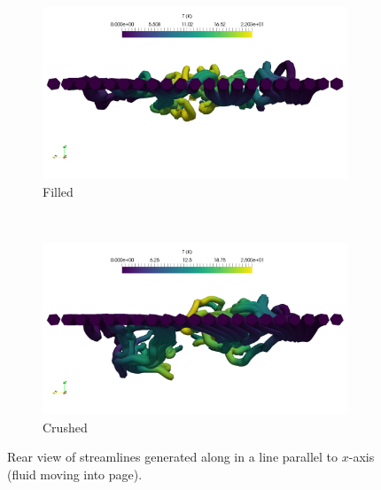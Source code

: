 \begin{figure}[!ht]
    \centering
    \begin{subfigure}[b]{0.44\textwidth}
        \includegraphics[width = \textwidth]{figures/lbm/temperature-streamlines-filled-x-normal}
        \caption{Filled}\label{fig:streamlines-filled-x}
    \end{subfigure}
    ~
    \begin{subfigure}[b]{0.44\textwidth}
        \includegraphics[width = \textwidth]{figures/lbm/temperature-streamlines-crushed-x-normal}
        \caption{Crushed}\label{fig:streamlines-crushed-x}
    \end{subfigure}
    \caption{Rear view of streamlines generated along in a line parallel to $x$-axis (fluid moving into page).}\label{fig:streamlines-x}
\end{figure}

